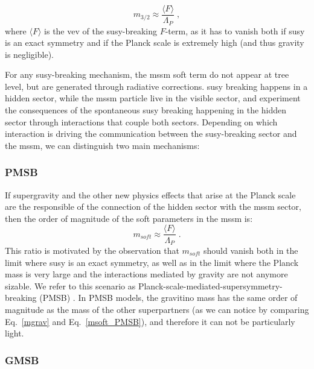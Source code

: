 \begin{equation}
m_{3/2} \approx \frac{\langle F \rangle}{\Lambda_P} \; ,
\label{mgrav}
\end{equation}
\noindent where $\langle F \rangle$ is the \gls{vev} of the \gls{susy}-breaking $F$-term, as it has to vanish both if \gls{susy} is an exact symmetry and if the Planck scale is extremely high (and thus gravity is negligible). 

For any \gls{susy}-breaking mechanism, the \gls{mssm} soft term do not appear at tree level, but are generated through radiative corrections. \gls{susy} breaking happens in a hidden sector, while the \gls{mssm} particle live in the visible sector, and experiment the consequences of the spontaneous \gls{susy} breaking happening in the hidden sector through interactions that couple both sectors. Depending on which interaction is driving the communication between the \gls{susy}-breaking sector and the \gls{mssm}, we can distinguish two main mechanisms:

\subsubsection*{PMSB} 

If supergravity and the other new physics effects that arise at the Planck scale are the responsible of the connection of the hidden sector with the \gls{mssm} sector, then the order of magnitude of the soft parameters in the \gls{mssm} is:
\begin{equation}
m_{soft} \approx \frac{\langle F \rangle}{\Lambda_P} \; .
\label{msoft_PMSB}
\end{equation}
\noindent This ratio is motivated by the observation that $m_{soft}$ should vanish both in the limit where \gls{susy} is an exact symmetry, as well as in the limit where the Planck mass is very large and the interactions mediated by gravity are not anymore sizable. We refer to this scenario as Planck-scale-mediated-supersymmetry-breaking (PMSB) \cite{PhysRevLett.49.970, BARBIERI1982343, IBANEZ198273, PhysRevD.27.2359}. In PMSB models, the gravitino mass has the same order of magnitude as the mass of the other superpartners (as we can notice by comparing Eq.~\ref{mgrav} and Eq.~\ref{msoft_PMSB}), and therefore it can not be particularly light. 

\subsubsection*{GMSB}

